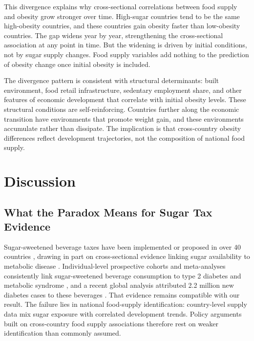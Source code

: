 \documentclass[letterpaper,11pt,leqno]{article}
\begin{document}
This divergence explains why cross-sectional correlations between food supply and obesity grow stronger over time. High-sugar countries tend to be the same high-obesity countries, and these countries gain obesity faster than low-obesity countries. The gap widens year by year, strengthening the cross-sectional association at any point in time. But the widening is driven by initial conditions, not by sugar supply changes. Food supply variables add nothing to the prediction of obesity change once initial obesity is included.

The divergence pattern is consistent with structural determinants: built environment, food retail infrastructure, sedentary employment share, and other features of economic development that correlate with initial obesity levels. These structural conditions are self-reinforcing. Countries further along the economic transition have environments that promote weight gain, and these environments accumulate rather than dissipate. The implication is that cross-country obesity differences reflect development trajectories, not the composition of national food supply.

\section{Discussion}

\subsection{What the Paradox Means for Sugar Tax Evidence}

Sugar-sweetened beverage taxes have been implemented or proposed in over 40 countries \citep{who2023ssb}, drawing in part on cross-sectional evidence linking sugar availability to metabolic disease \citep{basu2013, basu2013ajph}. Individual-level prospective cohorts and meta-analyses consistently link sugar-sweetened beverage consumption to type 2 diabetes and metabolic syndrome \citep{imamura2015, malik2010}, and a recent global analysis attributed 2.2 million new diabetes cases to these beverages \citep{laracastor2025}. That evidence remains compatible with our result. The failure lies in national food-supply identification: country-level supply data mix sugar exposure with correlated development trends. Policy arguments built on cross-country food supply associations therefore rest on weaker identification than commonly assumed.
\end{document}
